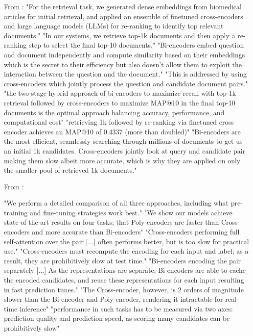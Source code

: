 From \parencite{verma2025beyond_retrieval_ensembling_cross_encoders}:
"For the retrieval task, we generated dense embeddings from biomedical articles for initial retrieval, and applied an ensemble of finetuned cross-encoders and large language models (LLMs) for re-ranking to identify top relevant documents."
"In our systems, we retrieve top-1k documents and then apply a re-ranking step to select the final top-10 documents."
"Bi-encoders embed question and document independently and compute similarity based on their embeddings which is the secret to their efficiency but also doesn't allow them to exploit the interaction between the question and the document."
"This is addressed by using cross-encoders which jointly process the question and candidate document pairs."
"the two-stage hybrid approach of bi-encoders to maximize recall with top-1k retrieval followed by cross-encoders to maximize MAP@10 in the final top-10 documents is the optimal approach balancing accuracy, performance, and computational cost"
"retrieving 1k followed by re-ranking via finetuned cross encoder achieves an MAP@10 of 0.4337 (more than doubled)"
"Bi-encoders are the most efficient, seamlessly searching through millions of documents to get us an initial 1k candidates. Cross-encoders jointly look at query and candidate pair making them slow albeit more accurate, which is why they are applied on only the smaller pool of retrieved 1k documents."

From \parencite{humeau2020poly_encoders_transformer_architectures}:

"We perform a detailed comparison of all three approaches, including what pre-training and fine-tuning strategies work best."
"We show our models achieve state-of-the-art results on four tasks; that Poly-encoders are faster than Cross-encoders and more accurate than Bi-encoders"
"Cross-encoders performing full self-attention over the pair [...] often performs better, but is too slow for practical use."
"Cross-encoders must recompute the encoding for each input and label; as a result, they are prohibitively slow at test time."
"Bi-encoders encoding the pair separately [...] As the representations are separate, Bi-encoders are able to cache the encoded candidates, and reuse these representations for each input resulting in fast prediction times."
"The Cross-encoder, however, is 2 orders of magnitude slower than the Bi-encoder and Poly-encoder, rendering it intractable for real-time inference"
"performance in such tasks has to be measured via two axes: prediction quality and prediction speed, as scoring many candidates can be prohibitively slow"

